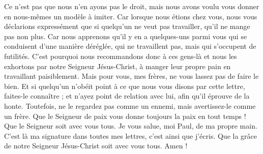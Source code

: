 \begin{multicols}{2}
Ce n’est pas que nous n'en ayons pas le droit, mais nous avons voulu vous donner en nous-mêmes un modèle à imiter.
Car lorsque nous étions chez vous, nous vous déclarions expressément que si quelqu'un ne veut pas travailler, qu'il ne mange pas non plus.
Car nous apprenons qu'il y en a quelques-uns parmi vous qui se conduisent d'une manière déréglée, qui ne travaillent pas, mais qui s’occupent de futilités.
C’est pourquoi nous recommandons donc à ces gens-là et nous les exhortons par notre Seigneur Jésus-Christ, à manger leur propre pain en travaillant paisiblement.
Mais pour vous, mes frères, ne vous lassez pas de faire le bien.
Et si quelqu'un n'obéit point à ce que nous vous disons par cette lettre, faites-le connaître ; et n’ayez point de relation avec lui, afin qu’il éprouve de la honte.
Toutefois, ne le regardez pas comme un ennemi, mais avertissez-le comme un frère.
Que le Seigneur de paix vous donne toujours la paix en tout temps ! Que le Seigneur soit avec vous tous.
Je vous salue, moi Paul, de ma propre main. C’est là ma signature dans toutes mes lettres, c'est ainsi que j'écris.
Que la grâce de notre Seigneur Jésus-Christ soit avec vous tous. Amen !
\PPE{}
\end{multicols}
